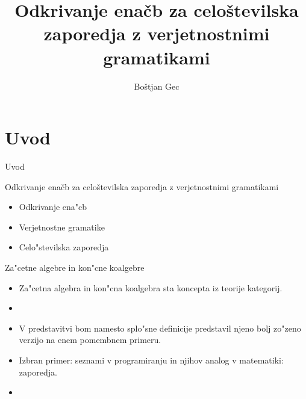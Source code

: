 \documentclass[t,usenames,dvipsnames]{beamer} %
\title{Odkrivanje enačb za celoštevilska zaporedja z verjetnostnimi gramatikami}
\author{Boštjan Gec}
\institute{mentor: prof. dr. Ljupčo Todorovski}
\begin{document}
\begin{frame}
  \maketitle
\end{frame}


\section{Uvod}

\begin{frame}{Uvod}
	\begin{block}{Odkrivanje enačb za celoštevilska zaporedja z verjetnostnimi gramatikami} 
	\begin{itemize}
		\item Odkrivanje ena"cb		
		\item Verjetnostne gramatike		
		\item Celo"stevilska zaporedja		
	\end{itemize}
	\end{block}
\end{frame}
\begin{frame}{Za"cetne algebre in kon"cne koalgebre}
	\begin{itemize}
		\item 	Za"cetna algebra in kon"cna koalgebra sta koncepta iz teorije kategorij.
		
		\item 
		
		\item V predstavitvi bom namesto splo"sne definicije predstavil njeno bolj zo"zeno verzijo na enem pomembnem primeru.
		
		\item Izbran primer: seznami v programiranju in njihov analog v matematiki: zaporedja.
		
		\item 
	\end{itemize}
\end{frame}
\end{document}
